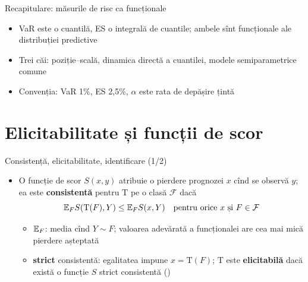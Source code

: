 \begin{frame}{Recapitulare: măsurile de risc ca funcționale}
\itemsize{\small}
\begin{itemize}
    \item VaR este o cuantilă, ES o integrală de cuantile; ambele sînt funcționale ale distribuției predictive
    \item Trei căi: poziție--scală, dinamica directă a cuantilei, modele semiparametrice comune
    \item Convenția: VaR 1\%, ES 2,5\%, $\alpha$ este rata de depășire țintă
\end{itemize}
\end{frame}


\section{Elicitabilitate și funcții de scor}

\begin{frame}{Consistență, elicitabilitate, identificare (1/2)}
\itemsize{\small}
\begin{itemize}
    \item O funcție de scor $S(x, y)$ atribuie o pierdere prognozei $x$ cînd se observă $y$; ea este \textbf{consistentă} pentru $\mathrm T$ pe o clasă $\mathcal F$ dacă 
    \[ \mathbb{E}_F S(\mathrm T(F), Y) \le \mathbb{E}_F S(x, Y) \quad \text{pentru orice } x \text{ și } F \in \mathcal F \]
    \begin{itemize}
        \item $\mathbb{E}_F$: media cînd $Y \sim F$; valoarea adevărată a funcționalei are cea mai mică pierdere așteptată
        \item \textbf{strict} consistentă: egalitatea impune $x = \mathrm T(F)$; $\mathrm T$ este \textbf{elicitabilă} dacă există o funcție $S$ strict consistentă ()
    \end{itemize}
\end{itemize}
\end{frame}

